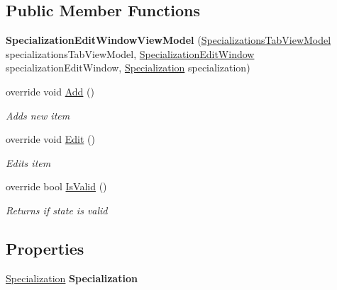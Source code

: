 \subsection*{Public Member Functions}
\begin{DoxyCompactItemize}
\item 
\hypertarget{class_baudi_1_1_client_1_1_view_models_1_1_edit_window_view_models_1_1_specialization_edit_window_view_model_af8a1023bcad1affefbb46ccfc1176507}{}{\bfseries Specialization\+Edit\+Window\+View\+Model} (\hyperlink{class_baudi_1_1_client_1_1_view_models_1_1_tabs_view_models_1_1_specializations_tab_view_model}{Specializations\+Tab\+View\+Model} specializations\+Tab\+View\+Model, \hyperlink{class_baudi_1_1_client_1_1_view_1_1_edit_windows_1_1_specialization_edit_window}{Specialization\+Edit\+Window} specialization\+Edit\+Window, \hyperlink{class_baudi_1_1_d_a_l_1_1_models_1_1_specialization}{Specialization} specialization)\label{class_baudi_1_1_client_1_1_view_models_1_1_edit_window_view_models_1_1_specialization_edit_window_view_model_af8a1023bcad1affefbb46ccfc1176507}

\item 
override void \hyperlink{class_baudi_1_1_client_1_1_view_models_1_1_edit_window_view_models_1_1_specialization_edit_window_view_model_ab8716c495482327ac3016ceb6715418d}{Add} ()
\begin{DoxyCompactList}\small\item\em Adds new item \end{DoxyCompactList}\item 
override void \hyperlink{class_baudi_1_1_client_1_1_view_models_1_1_edit_window_view_models_1_1_specialization_edit_window_view_model_a0cb7d3c497976975902297216c028261}{Edit} ()
\begin{DoxyCompactList}\small\item\em Edits item \end{DoxyCompactList}\item 
override bool \hyperlink{class_baudi_1_1_client_1_1_view_models_1_1_edit_window_view_models_1_1_specialization_edit_window_view_model_a9b65b5193fa8bf34c1f224ac1c257b33}{Is\+Valid} ()
\begin{DoxyCompactList}\small\item\em Returns if state is valid \end{DoxyCompactList}\end{DoxyCompactItemize}
\subsection*{Properties}
\begin{DoxyCompactItemize}
\item 
\hypertarget{class_baudi_1_1_client_1_1_view_models_1_1_edit_window_view_models_1_1_specialization_edit_window_view_model_a72c766ae9eed684ba631d67ee59d6f6c}{}\hyperlink{class_baudi_1_1_d_a_l_1_1_models_1_1_specialization}{Specialization} {\bfseries Specialization}\label{class_baudi_1_1_client_1_1_view_models_1_1_edit_window_view_models_1_1_specialization_edit_window_view_model_a72c766ae9eed684ba631d67ee59d6f6c}

\end{DoxyCompactItemize}
